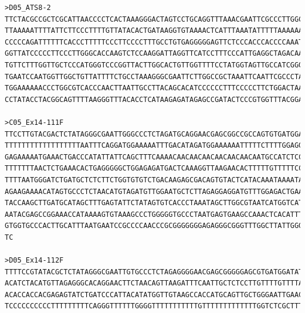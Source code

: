\begin{verbatim}
>D05_ATS8-2
TTCTACGCCGCTCGCATTAACCCCTCACTAAAGGGACTAGTCCTGCAGGTTTAAACGAATTCGCCCTTGGCCACGCGTCGACTAGTACTTTTTTTTTTTTTGGGGTTTTAAAAAAATTTA
TTAAAAATTTTATTCTTCCCTTTTGTTATACACTGATAAGGTGTAAAACTCATTTAAATATTTTTAAAAAAATTATTTTATCTATTTGCTTTCCAAATTTTGTTCCTTCTCCTGGTCTTC
CCCCCAGATTTTTTCACCCTTTTTCCCTTCCCCTTTGCCTGTGAGGGGGAGTTCTCCCACCCACCCCAAATGACCCACCCACCCATTCCCACCTCACCTCACTTTACTGCCCCATCCCTG
GGTTATCCCCCTTCCCTTGGGCACCAAGTCTCCAAGGATTAGGTTCATCCTTTCCCATTGAGGCTAGACAAAGCACTTCTTATCTACATATATTCCAGGGGCCATGGGCCAGTCCATGTA
TGTTCTTTGGTTGCTCCCATGGGTCCCGGTTACTTGGCACTGTTGGTTTTCCTATGGTAGTTGCCATCGGGGTCAGTTCTTTCAATCCTTCATCCAGGTTTTCCATAGGGGTGTCCAACC
TGAATCCAATGGTTGGCTGTTATTTTCTGCCTAAAGGGCGAATTCTTGGCCGCTAAATTCAATTCGCCCTATAGTGAGTGGTATGACAATTCACTGGCCGTCCTTTTACAACGTCCTGAC
TGGAAAAAACCCTGGCGTCACCCAACTTAATTGCCTTACAGCACATCCCCCCTTTCCCCCTTCTGGACTAATAGCCAAAGAGGCCCGCACCCGATCGCTCCTTGTCTACAGTTGTACAAG
CCTATACCTACGGCAGTTTTAAGGGTTTACACCTCATAAGAGATAGAGCCGATACTCCCGTGGTTTACGGAATGGTACAG

>C05_Ex14-111F
TTCCTTGTACGACTCTATAGGGCGAATTGGGCCCTCTAGATGCAGGAACGAGCGGCCGCCAGTGTGATGGATATCGGGGAGAAAAAAGCCCTTGGCCAGAGCGACTAGTACTTTTTTTTT
TTTTTTTTTTTTTTTTTTAATTTCAGGATGGAAAAATTTGACATAGATGGAAAAAATTTTTCTTTTGGAGGAAAAAATATCTTAACCAAATGGTGTGGGGACAAGTGGTTTGTTGTTATG
GAGAAAAATGAAACTGACCCATATTATTCAGCTTTCAAAACAACAACAACAACAACAACAATGCCATCTCCAAAACCCAAAAAACAAAACCAAAAAAAAATATTTTAAAAAAAAAAAATC
TTTTTTTAACTCTGAAACACTGAGGGGGCTGGAGAGATGACTCAAAGGTTAAGAACACTTTTTGTTTTTCCTGAGGTCCTGAGTTCAATTCCCAGCAACTGCATGGTGGCTTACAACCAT
TTTTAATGGGATCTGATGCTCTCTTCTGGTGTGTCTGACAAGAGCGACAGTGTACTCATACAAATAAAATAAATAAATCTTAAAACAAAACAAGAAAACCACTGAAATACTGAAACTGTT
AGAAGAAAACATAGTGCCCTCTAACATGTAGATGTTGGAATGCTCTTAGAGGAGGATGTTTGGAGACTGAAGGGCGAATTCCAGCACACTGGCGGCCGTTACTAGTGGATCCGAGCTCGG
TACCAAGCTTGATGCATAGCTTTGAGTATTCTATAGTGTCACCCTAAATAGCTTGGCGTAATCATGGTCATAGCTGTTTCCTGGGTGAAATTGTTATCCCCCTCCCAATTCCCCCACAAC
AATACGAGCCGGAAACCATAAAAGTGTAAAGCCCTGGGGGTGCCCTAATGAGTGAAGCCAAACTCACATTTATTTGGCGTTGCGCTTCCCTGCCCCGCTTTTCCAGTCGGGAAAACCCTG
GTGGTGCCCACTTGCATTTAATGAATCCGCCCCAACCCGCGGGGGGGAGAGGGCGGGTTTGGCTTATTGGGGCGCTCTTTTCCCTTTTCCTTGCGCTTACTCTGACCTCGGTTCGGGGCC
TC

>D05_Ex14-112F
TTTTCCGTATACGCTCTATAGGGCGAATTGTGCCCTCTAGAGGGGAACGAGCGGGGGAGCGTGATGGATATCTGGATGGAAGCCTGTCGGTGGGGAACATCCTCCTCTAAGAGCATTCCA
ACATCTACATGTTAGAGGGCACAGGAACTTCTAACAGTTAAGATTTCAATTGCTCTCCTTGTTTTGTTTTAAGATTTATTTATTTTATTTGTATGAGTACACTGTTTTCTCTTGTCAGAC
ACACCACCACGAGAGTATCTGATCCCATTACATATGGTTGTAAGCCACCATGCAGTTGCTGGGAATTGAACTCAGGACCTCAGGAAGTTTCATTCTTTGTTCTTAACCTTTTGAGTTATC
TCCCCCCCCCCTTTTTTTTTCAGGGTTTTTTGGGGTTTTTTTTTTTGTTTTTTTTTTTTTGGTCTCGCTTTTTTTTTTTTACCCTGTTTTTTTTTTTTTTTTTT


\end{verbatim}
